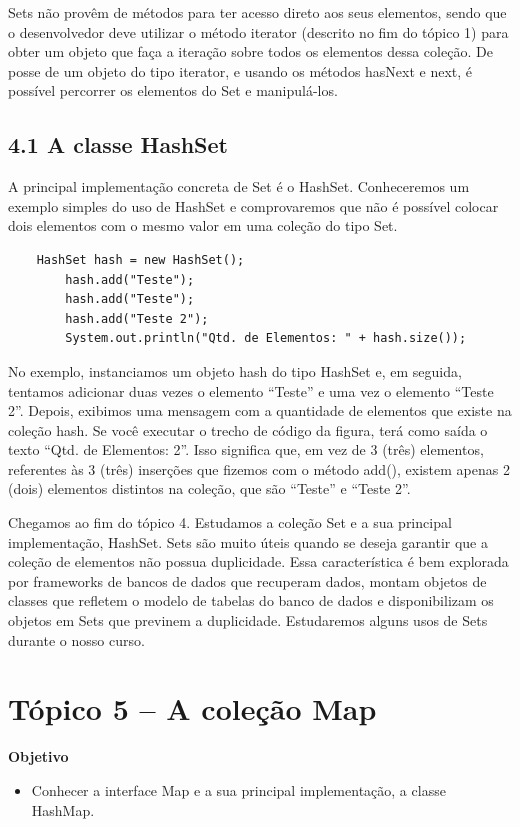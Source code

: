 \documentclass[11pt]{article}
\begin{document}
Sets não provêm de métodos para ter acesso direto aos seus elementos, sendo que o desenvolvedor deve utilizar o método iterator (descrito no fim do tópico 1) para obter um objeto que faça a iteração sobre todos os elementos dessa coleção. De posse de um objeto do tipo iterator, e usando os métodos hasNext e next, é possível percorrer os elementos do Set e manipulá-los.

\subsection{4.1 A classe HashSet}
\label{sec:org0dfc094}
A principal implementação concreta de Set é o HashSet. Conheceremos um exemplo simples do uso de HashSet e comprovaremos que não é possível colocar dois elementos com o mesmo valor em uma coleção do tipo Set.

\begin{verbatim}
    HashSet hash = new HashSet();
        hash.add("Teste");
        hash.add("Teste");
        hash.add("Teste 2");
        System.out.println("Qtd. de Elementos: " + hash.size());
\end{verbatim}

No exemplo, instanciamos um objeto hash do tipo HashSet e, em seguida, tentamos adicionar duas vezes o elemento “Teste” e uma vez o elemento “Teste 2”. Depois, exibimos uma mensagem com a quantidade de elementos que existe na coleção hash. Se você executar o trecho de código da figura, terá como saída o texto “Qtd. de Elementos: 2”. Isso significa que, em vez de 3 (três) elementos, referentes às 3 (três) inserções que fizemos com o método add(), existem apenas 2 (dois) elementos distintos na coleção, que são “Teste” e “Teste 2”.

Chegamos ao fim do tópico 4. Estudamos a coleção Set e a sua principal implementação, HashSet. Sets são muito úteis quando se deseja garantir que a coleção de elementos não possua duplicidade. Essa característica é bem explorada por frameworks de bancos de dados que recuperam dados, montam objetos de classes que refletem o modelo de tabelas do banco de dados e disponibilizam os objetos em Sets que previnem a duplicidade. Estudaremos alguns usos de Sets durante o nosso curso.

\section{Tópico 5 – A coleção Map}
\label{sec:orgfca613c}
\textbf{Objetivo}
\begin{itemize}
\item Conhecer a interface Map e a sua principal implementação, a classe HashMap.
\end{itemize}
\end{document}
